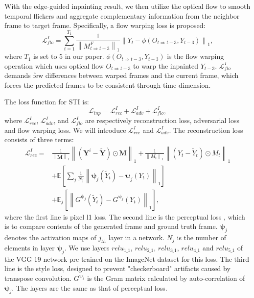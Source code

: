 With the edge-guided inpainting result, we then utilize the optical flow to smooth temporal flickers and aggregate complementary information from the neighbor frame to target frame.
Specifically, a flow warping loss is proposed:
\begin{equation}
	\label{eq:inp_flow}
	\mathcal{L}^I_{flo}=\sum_{t=1}^{T_1}\frac{1}{\left\|M^F_{t\Rightarrow t-3}\right\|_1}\left\| Y_t-\phi(O_{t\Rightarrow t-3},Y_{t-3}) \right\|_1,
\end{equation}
where $T_1$ is set to $5$ in our paper. $\phi(O_{t\Rightarrow t-3},Y_{t-3})$ is the flow warping operation which uses optical flow $O_{t\Rightarrow t-3}$ to warp the inpainted $Y_{t-3}$. $\mathcal{L}^I_{flo}$ demands few differences between warped frames and the current frame, which forces the predicted frames to be consistent through time dimension.



The loss function for STI is:
\begin{equation}
	\label{eq:inpain_all}
	\mathcal{L}_{inp}=\mathcal{L}^{I}_{rec}+\mathcal{L}^I_{adv}+\mathcal{L}^I_{flo},
\end{equation}
where $\mathcal{L}^{I}_{rec}$, $\mathcal{L}^I_{adv}$, and $\mathcal{L}^I_{flo}$ are respectively reconstruction loss, adversarial loss and flow warping loss.
We will introduce $\mathcal{L}^{I}_{rec}$ and $\mathcal{L}^I_{adv}$.
The reconstruction loss consists of three terms:
\begin{equation}
	\begin{aligned}
		\mathcal{L}^{I}_{rec}=&\frac{1}{\left\|\boldsymbol{M} \right\|_1}\left\|(\boldsymbol{Y}^i-\widetilde{\boldsymbol{Y}})\odot \boldsymbol{M}\right\|_1 +\frac{1}{\left\|M_t \right\|_1}\left\|(Y_t-\widetilde{Y}_t)\odot M_t\right\|_1\\
		&+\mathbb{E}[\sum_{j}\frac{1}{N_j}\left\|\boldsymbol{\psi}_j(\widetilde{Y}_t)-\boldsymbol{\psi}_j(Y_t)\right\|_1]\\
		&+\mathbb{E}_j[\left\|G^{\boldsymbol{\psi}_j}(\widetilde{Y}_t)-G^{\boldsymbol{\psi}_j}(Y_t)\right\|_1],
	\end{aligned}
\end{equation}
where the first line is pixel l1 loss. The second line is the perceptual loss \cite{gatys2015neural}, which is to compare contents of the generated frame and ground truth frame.
$\boldsymbol{\psi}_j$ denotes the activation maps of $j_{th}$ layer in a network.
$N_j$ is the number of elements in layer $\boldsymbol{\psi}_j$. We use layers $relu_{1\_1}$, $relu_{2\_1}$, $relu_{3\_1}$, $relu_{4\_1}$ and $relu_{5\_1}$ of the VGG-19 network pre-trained on the ImageNet dataset for this loss. The third line is the style loss, designed to prevent "checkerboard" artifacts \cite{Sajjadi_2017_ICCV} caused by transpose convolution. $G^{\boldsymbol{\psi}_j}$ is the Gram matrix calculated by auto-correlation of $\boldsymbol{\psi}_j$. The layers are the same as that of perceptual loss.

